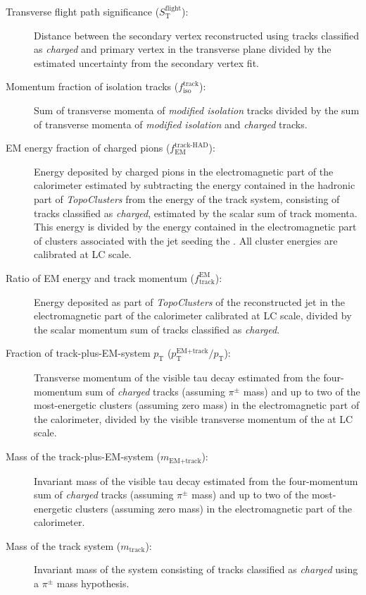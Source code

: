 \begin{description}
\item[Transverse flight path significance ($S_\text{T}^\text{flight}$):]
  Distance between the secondary vertex reconstructed using tracks classified as
  \emph{charged} and primary vertex in the transverse plane divided by the
  estimated uncertainty from the secondary vertex fit.

\item[Momentum fraction of isolation tracks ($f_\text{iso}^\text{track}$):] Sum
  of transverse momenta of \emph{modified isolation} tracks divided by the sum
  of transverse momenta of \emph{modified isolation} and \emph{charged} tracks.

\item[EM energy fraction of charged pions ($f_\text{EM}^\text{track-HAD}$):]
  Energy deposited by charged pions in the electromagnetic part of the
  calorimeter estimated by subtracting the energy contained in the hadronic part
  of \emph{TopoClusters} from the energy of the track system, consisting of
  tracks classified as \emph{charged}, estimated by the scalar sum of track
  momenta. This energy is divided by the energy contained in the electromagnetic
  part of clusters associated with the jet seeding the \tauhadvis. All cluster
  energies are calibrated at LC scale.

\item[Ratio of EM energy and track momentum ($f_\text{track}^\text{EM}$):]
  Energy deposited as part of \emph{TopoClusters} of the reconstructed jet in
  the electromagnetic part of the calorimeter calibrated at LC scale, divided by
  the scalar momentum sum of tracks classified as \emph{charged}.

\item[Fraction of track-plus-EM-system $p_\text{T}$
  ($p_\text{T}^\text{EM+track} / p_\text{T}$):] Transverse momentum of the
  visible tau decay estimated from the four-momentum sum of \emph{charged}
  tracks (assuming $\pi^\pm$ mass) and up to two of the most-energetic clusters
  (assuming zero mass) in the electromagnetic part of the calorimeter, divided
  by the visible transverse momentum of the \tauhadvis at LC scale.

\item[Mass of the track-plus-EM-system ($m_\text{EM+track}$):] Invariant mass of
  the visible tau decay estimated from the four-momentum sum of \emph{charged}
  tracks (assuming $\pi^\pm$ mass) and up to two of the most-energetic clusters
  (assuming zero mass) in the electromagnetic part of the calorimeter.

\item[Mass of the track system ($m_\text{track}$):] Invariant mass of the system
  consisting of tracks classified as \emph{charged} using a $\pi^\pm$ mass
  hypothesis.
\end{description}
